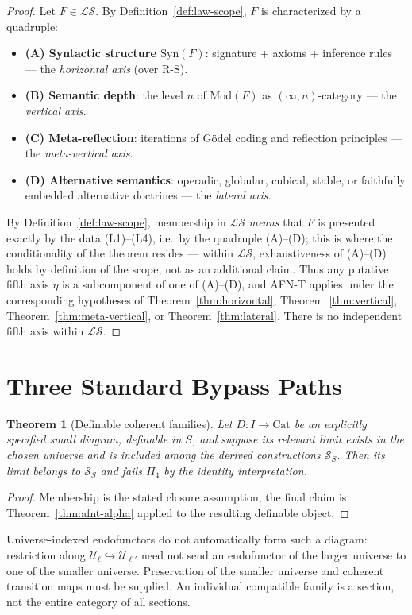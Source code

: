 \documentclass[11pt]{article}
\theoremstyle{plain}
\newtheorem{theorem}{Theorem}[section]
\theoremstyle{definition}
\newcommand{\RS}{\mathrm{R\text{-}S}}
\newcommand{\cS}{\mathcal{S}}
\newcommand{\cL}{\mathcal{L}}
\newcommand{\Cat}{\mathrm{Cat}}
\newcommand{\Syn}{\mathrm{Syn}}
\newcommand{\Mod}{\mathrm{Mod}}
\newcommand{\cU}{\mathcal{U}}
\begin{document}
\begin{proof}
Let $F \in \cL\cS$. By Definition~\ref{def:law-scope}, $F$ is characterized by a quadruple:
\begin{itemize}
\item \textbf{(A) Syntactic structure $\Syn(F)$}: signature + axioms + inference rules --- the \emph{horizontal axis} (over $\RS$).
\item \textbf{(B) Semantic depth}: the level $n$ of $\Mod(F)$ as $(\infty, n)$-category --- the \emph{vertical axis}.
\item \textbf{(C) Meta-reflection}: iterations of G\"odel coding and reflection principles --- the \emph{meta-vertical axis}.
\item \textbf{(D) Alternative semantics}: operadic, globular, cubical, stable, or faithfully embedded alternative doctrines --- the \emph{lateral axis}.
\end{itemize}
By Definition~\ref{def:law-scope}, membership in $\cL\cS$ \emph{means} that $F$ is presented exactly by the data (L1)--(L4), i.e.\ by the quadruple (A)--(D); this is where the conditionality of the theorem resides --- within $\cL\cS$, exhaustiveness of (A)--(D) holds by definition of the scope, not as an additional claim. Thus any putative fifth axis $\eta$ is a subcomponent of one of (A)--(D), and AFN-T applies under the corresponding hypotheses of Theorem~\ref{thm:horizontal}, Theorem~\ref{thm:vertical}, Theorem~\ref{thm:meta-vertical}, or Theorem~\ref{thm:lateral}. There is no independent fifth axis within $\cL\cS$.
\end{proof}

\section{Three Standard Bypass Paths}\label{sec:bypass}

\begin{theorem}[Definable coherent families]\label{thm:universe}
Let $D:I\to\Cat$ be an explicitly specified small diagram, definable in
$S$, and suppose its relevant limit exists in the chosen universe and is
included among the derived constructions $\cS_S$. Then its limit belongs
to $\cS_S$ and fails $\Pi_4$ by the identity interpretation.
\end{theorem}
\begin{proof}
Membership is the stated closure assumption; the final claim is
Theorem~\ref{thm:afnt-alpha} applied to the resulting definable object.
\end{proof}
Universe-indexed endofunctors do not automatically form such a diagram:
restriction along $\cU_\ell\hookrightarrow\cU_{\ell'}$ need not send an
endofunctor of the larger universe to one of the smaller universe.
Preservation of the smaller universe and coherent transition maps must
be supplied. An individual compatible family is a section, not the
entire category of all sections.
\end{document}
